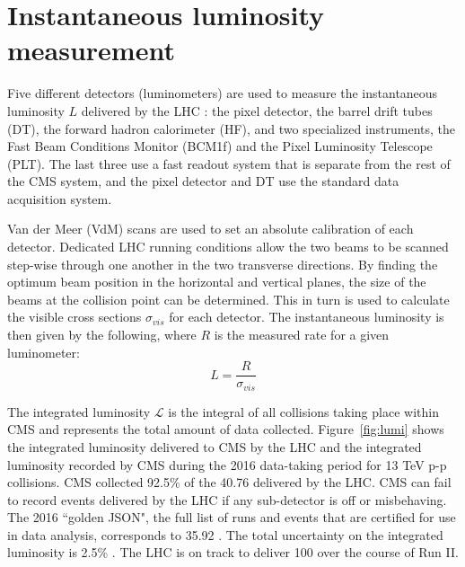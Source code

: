 \section{Instantaneous luminosity measurement}
\label{sec:lumi}

Five different detectors (luminometers) are used to measure the instantaneous luminosity $L$ delivered by the LHC \cite{lumiPAS}: the pixel detector, the barrel drift tubes (DT), the forward hadron calorimeter (HF), and two specialized instruments, the Fast Beam Conditions Monitor (BCM1f) and the Pixel Luminosity Telescope (PLT). The last three use a fast readout system that is separate from the rest of the CMS system, and the pixel detector and DT use the standard data acquisition system. 

Van der Meer (VdM) scans \cite{VanderMeer} are used to set an absolute calibration of each detector. Dedicated LHC running conditions allow the two beams to be scanned step-wise through one another in the two transverse directions. By finding the optimum beam position in the horizontal and vertical planes, the size of the beams at the collision point can be determined. This in turn is used to calculate the visible cross sections $\sigma_{vis}$ for each detector. The instantaneous luminosity is then given by the following, where $R$ is the measured rate for a given luminometer:
\begin{equation}
L = \frac{R}{\sigma_{vis}}
\end{equation}

The integrated luminosity $\mathcal{L}$ is the integral of all collisions taking place within CMS and represents the total amount of data collected. Figure~\ref{fig:lumi} shows the integrated luminosity delivered to CMS by the LHC and the integrated luminosity recorded by CMS during the 2016 data-taking period for 13 TeV p-p collisions. CMS collected 92.5\% of the 40.76 \fbinv delivered by the LHC. CMS can fail to record events delivered by the LHC if any sub-detector is off or misbehaving. The 2016 ``golden JSON", the full list of runs and events that are certified for use in data analysis, corresponds to 35.92 \fbinv. The total uncertainty on the integrated luminosity is 2.5\% \cite{lumiPAS}. The LHC is on track to deliver 100 \fbinv over the course of Run II. 


